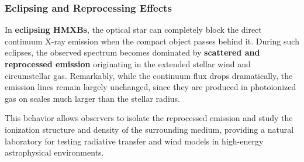 \subsubsection{Eclipsing and Reprocessing Effects}

In \textbf{eclipsing HMXBs}, the optical star can completely block the direct continuum X-ray emission when the compact object passes behind it. During such eclipses, the observed spectrum becomes dominated by \textbf{scattered and reprocessed emission} originating in the extended stellar wind and circumstellar gas. Remarkably, while the continuum flux drops dramatically, the emission lines remain largely unchanged, since they are produced in photoionized gas on scales much larger than the stellar radius.

\par
This behavior allows observers to isolate the reprocessed emission and study the ionization structure and density of the surrounding medium, providing a natural laboratory for testing radiative transfer and wind models in high-energy astrophysical environments.


